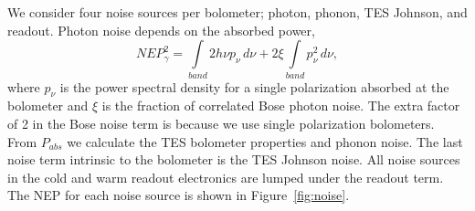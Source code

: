 \documentclass[]{spie}  %
\newcommand{\comr}[1]{\textcolor{red}{#1}}
\begin{document}

We consider four noise sources per bolometer; photon, phonon, TES Johnson, and readout. 
Photon noise depends on the absorbed power\cite{richards1994}, 
\begin{equation}
\label{eq:photon}
NEP_{\gamma}^2 = \int\limits_{band} 2h\nu p_{\nu} \, d\nu + 2\xi \int\limits_{band} p_{\nu}^2 \,  d\nu,
\end{equation} 
where $p_{\nu}$ is the power spectral density for a single polarization absorbed at the bolometer and $\xi$ is the fraction of correlated Bose 
photon noise. The extra factor of 2 in the Bose noise term is because we use single polarization bolometers.  
%
%
From $P_{abs}$ we calculate the TES bolometer properties and phonon noise.\cite{mather1982}  
The last noise term intrinsic to the bolometer is the TES Johnson noise. All noise sources in the cold and warm readout 
electronics are lumped under the readout term.  The NEP for each noise source is shown in Figure~\ref{fig:noise}.


\end{document}
